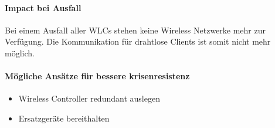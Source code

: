 \paragraph{Impact bei Ausfall}
Bei einem Ausfall aller WLCs stehen keine Wireless Netzwerke mehr zur Verfügung. Die Kommunikation für drahtlose Clients ist somit nicht mehr möglich.

\paragraph{Mögliche Ansätze für bessere krisenresistenz}
\begin{itemize}
	\item Wireless Controller redundant auslegen
	\item Ersatzgeräte bereithalten
\end{itemize}
